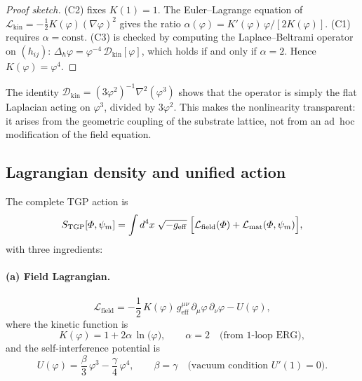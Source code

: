 \begin{proof}[Proof sketch]
(C2) fixes $K(1)=1$. The Euler--Lagrange equation of
$\mathcal{L}_{\mathrm{kin}}=-\frac{1}{2}K(\varphi)(\nabla\varphi)^{2}$
gives the ratio $\alpha(\varphi)=K'(\varphi)\,\varphi/[2K(\varphi)]$.
(C1) requires $\alpha=\mathrm{const}$.  (C3) is checked by computing
the Laplace--Beltrami operator on $(h_{ij})$:
$\Delta_{h}\varphi = \varphi^{-4}\,\mathcal{D}_{\mathrm{kin}}[\varphi]$,
which holds if and only if $\alpha=2$.
Hence $K(\varphi)=\varphi^{4}$.
\end{proof}

\noindent
The identity $\mathcal{D}_{\mathrm{kin}} = (3\varphi^{2})^{-1}\nabla^{2}(\varphi^{3})$
shows that the operator is simply the flat Laplacian acting on
$\varphi^{3}$, divided by $3\varphi^{2}$.  This makes the
nonlinearity transparent: it arises from the geometric coupling of
the substrate lattice, not from an ad~hoc modification of the field
equation.

\subsection{Lagrangian density and unified action}\label{ssec:action}

The complete TGP action is
\begin{equation}\label{eq:S-TGP}
  S_{\mathrm{TGP}}[\Phi,\psi_{m}]
  = \int d^{4}x\;\sqrt{-g_{\mathrm{eff}}}\;
    \Bigl[
      \mathcal{L}_{\mathrm{field}}(\Phi)
      + \mathcal{L}_{\mathrm{mat}}(\Phi,\psi_{m})
    \Bigr],
\end{equation}
with three ingredients:

\paragraph{(a) Field Lagrangian.}
\begin{equation}\label{eq:L-field}
  \mathcal{L}_{\mathrm{field}}
  = -\frac{1}{2}\,K(\varphi)\,
    g_{\mathrm{eff}}^{\mu\nu}\,
    \partial_{\mu}\varphi\,\partial_{\nu}\varphi
  - U(\varphi),
\end{equation}
where the kinetic function is
\begin{equation}\label{eq:K-function}
  K(\varphi) = 1 + 2\alpha\,\ln\!\bigl(\varphi\bigr),
  \qquad \alpha = 2
  \quad\text{(from 1-loop ERG)},
\end{equation}
and the self-interference potential is
\begin{equation}\label{eq:U-potential}
  U(\varphi)
  = \frac{\beta}{3}\,\varphi^{3} - \frac{\gamma}{4}\,\varphi^{4},
  \qquad \beta = \gamma
  \quad\text{(vacuum condition $U'(1)=0$)}.
\end{equation}

